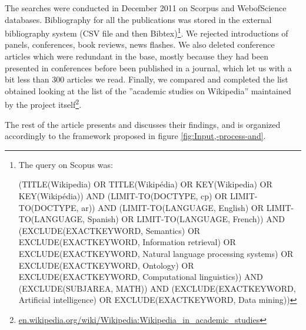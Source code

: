 The searches were conducted in December 2011 on Scorpus and WebofScience
databases. Bibliography for all the publications was stored in the
external bibliography system (CSV file and then Bibtex)\footnote{The query on Scopus was:

(TITLE(Wikipedia) OR TITLE(Wikip{\'{e}}dia) OR KEY(Wikipedia) OR KEY(Wikipédia))
AND (LIMIT-TO(DOCTYPE, \textquotedbl{}cp\textquotedbl{}) OR LIMIT-TO(DOCTYPE,
\textquotedbl{}ar\textquotedbl{})) AND (LIMIT-TO(LANGUAGE, \textquotedbl{}English\textquotedbl{})
OR LIMIT-TO(LANGUAGE, \textquotedbl{}Spanish\textquotedbl{}) OR LIMIT-TO(LANGUAGE,
\textquotedbl{}French\textquotedbl{})) AND (EXCLUDE(EXACTKEYWORD,
\textquotedbl{}Semantics\textquotedbl{}) OR EXCLUDE(EXACTKEYWORD,
\textquotedbl{}Information retrieval\textquotedbl{}) OR EXCLUDE(EXACTKEYWORD,
\textquotedbl{}Natural language processing systems\textquotedbl{})
OR EXCLUDE(EXACTKEYWORD, \textquotedbl{}Ontology\textquotedbl{}) OR
EXCLUDE(EXACTKEYWORD, \textquotedbl{}Computational linguistics\textquotedbl{}))
AND (EXCLUDE(SUBJAREA, \textquotedbl{}MATH\textquotedbl{})) AND (EXCLUDE(EXACTKEYWORD,
\textquotedbl{}Artificial intelligence\textquotedbl{}) OR EXCLUDE(EXACTKEYWORD,
\textquotedbl{}Data mining\textquotedbl{}))}. We rejected introductions of panels, conferences, book reviews,
news flashes. We also deleted conference articles which were redundant
in the base, mostly because they had been presented in conferences
before been published in a journal, which let us with a bit less than
300 articles we read. Finally, we compared and completed the list
obtained looking at the list of the ''academic studies on Wikipedia''
maintained by the project itself\footnote{\url{en.wikipedia.org/wiki/Wikipedia:Wikipedia_in_academic_studies}}.

The rest of the article presents and discusses their findings, and
is organized accordingly to the framework proposed in figure \ref{fig:Input,-process-and}.